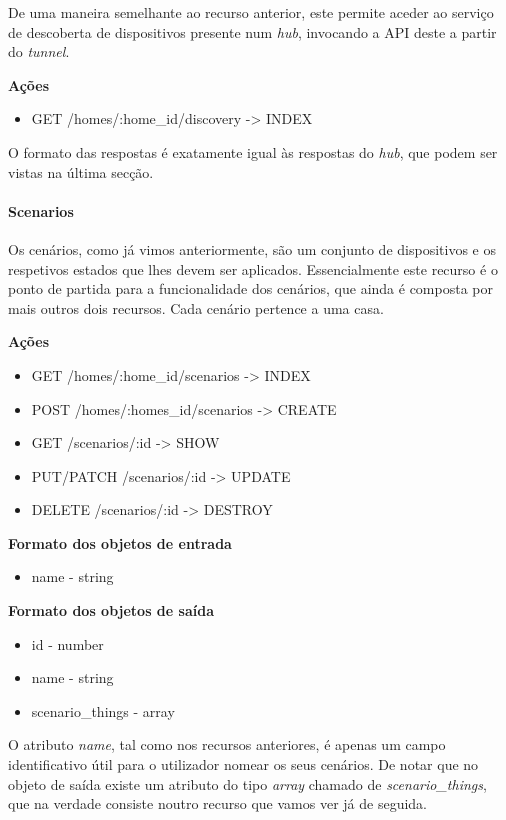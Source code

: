 De uma maneira semelhante ao recurso anterior, este permite aceder ao serviço de descoberta de dispositivos presente num \textit{hub}, invocando a API deste a partir do \textit{tunnel}.

\textbf{Ações}
\begin{itemize}
    \item GET /homes/:home{\_}id/discovery -> INDEX
\end{itemize}

O formato das respostas é exatamente igual às respostas do \textit{hub}, que podem ser vistas na última secção.


\paragraph*{Scenarios}

Os cenários, como já vimos anteriormente, são um conjunto de dispositivos e os respetivos estados que lhes devem ser aplicados. Essencialmente este recurso é o ponto de partida para a funcionalidade dos cenários, que ainda é composta por mais outros dois recursos. Cada cenário pertence a uma casa.

\textbf{Ações}
\begin{itemize}
    \item GET /homes/:home{\_}id/scenarios -> INDEX
    \item POST /homes/:homes{\_}id/scenarios -> CREATE
    \item GET /scenarios/:id -> SHOW
    \item PUT/PATCH /scenarios/:id -> UPDATE
    \item DELETE /scenarios/:id -> DESTROY
\end{itemize}

\textbf{Formato dos objetos de entrada}
\begin{itemize}
    \item name - string
\end{itemize}

\textbf{Formato dos objetos de saída}
\begin{itemize}
    \item id - number
    \item name - string
    \item scenario{\_}things - array
\end{itemize}

O atributo \textit{name}, tal como nos recursos anteriores, é apenas um campo identificativo útil para o utilizador nomear os seus cenários. De notar que no objeto de saída existe um atributo do tipo \textit{array} chamado de \textit{scenario{\_}things}, que na verdade consiste noutro recurso que vamos ver já de seguida.

